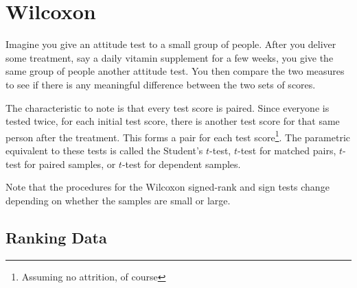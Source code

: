 \section{Wilcoxon}

Imagine you give an attitude test to a small group of people. After you deliver some treatment, say a daily vitamin supplement for a few weeks, you give the same group of people another attitude test. You then compare the two measures to see if there is any meaningful difference between the two sets of scores.

The characteristic to note is that every test score is paired. Since everyone is tested twice, for each initial test score, there is another test score for that same person after the treatment. This forms a pair for each test score\footnote{Assuming no attrition, of course}. The parametric equivalent to these tests is called the Student's $t$-test, $t$-test for matched pairs, $t$-test for paired samples, or $t$-test for dependent samples.

Note that the procedures for the Wilcoxon signed-rank and sign tests change depending on whether the samples are small or large.

\subsection{Ranking Data}

